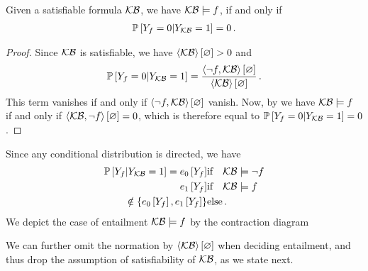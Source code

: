 %
\begin{theorem}
    \label{the:probEntailment}
    Given a satisfiable formula $\mathcal{KB}$, we have $\mathcal{KB}\models f$, if and only if
    \begin{align*}
        \mathbb{P}\left[Y_{f}=0|Y_{\mathcal{KB}}=1\right] = 0 \, .
    \end{align*}
\end{theorem}
\begin{proof}
    Since $\mathcal{KB}$ is satisfiable, we have $\left\langle \mathcal{KB}\right\rangle \left[ \varnothing \right]>0$ and
    \[ \mathbb{P}\left[Y_{f}=0|Y_{\mathcal{KB}}=1\right] = \frac{\left\langle \lnot f,\mathcal{KB}\right\rangle \left[ \varnothing \right]}{\left\langle \mathcal{KB}\right\rangle \left[ \varnothing \right]} \, .  \]
    This term vanishes if and only if $\left\langle \lnot f,\mathcal{KB}\right\rangle \left[ \varnothing \right]$ vanish.
    Now, by  we have $\mathcal{KB}\models f$ if and only if $\left\langle \mathcal{KB},\lnot f\right\rangle \left[ \varnothing \right]=0$, which is therefore equal to $\mathbb{P}\left[Y_{f}=0|Y_{\mathcal{KB}}=1\right]=0$.
\end{proof}

Since any conditional distribution is directed, we have
\begin{align}
    \condprobof{\formulavar}{\kbvar=1} = %
    \fbasisat{\formulavar}  & \text{if} \quad \kb\models\lnot\exformula \\
    \tbasisat{\formulavar}  & \text{if} \quad \kb\models\exformula \\
    \notin \{\fbasisat{\formulavar},\tbasisat{\formulavar}\} & \text{else}
    \, .
\end{align}
We depict the case of entailment $\mathcal{KB}\models f$ by the contraction diagram
\begin{center}
    
\end{center}

We can further omit the normation by $\left\langle \mathcal{KB}\right\rangle \left[ \varnothing \right]$ when deciding entailment, and thus drop the assumption of satisfiability of $\mathcal{KB}$, as we state next.

